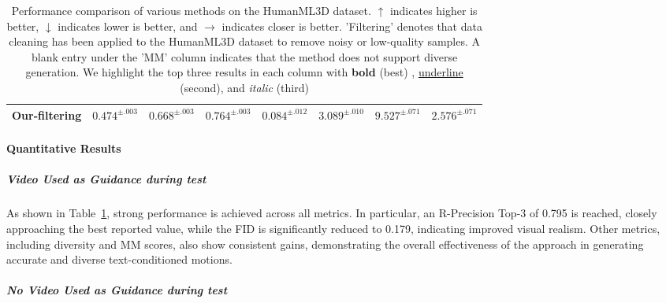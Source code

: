 \documentclass[a4paper,12pt]{article}
\begin{document}
\begin{table}[t]
\begin{tabular}{l|ccc|c|c|c|c}
Our-filtering   & $0.474^{\pm.003}$ & $0.668^{\pm.003}$ & $0.764^{\pm.003}$ & $0.084^{\pm.012}$ & $3.089^{\pm.010}$ & $9.527^{\pm.071}$ & $2.576^{\pm.071}$ \\
\bottomrule
\end{tabular}
\caption{
Performance comparison of various methods on the HumanML3D dataset. 
$\uparrow$ indicates higher is better, $\downarrow$ indicates lower is better, and $\rightarrow$ indicates closer is better.
'Filtering' denotes that data cleaning has been applied to the HumanML3D dataset to remove noisy or low-quality samples. A blank entry under the 'MM' column indicates that the method does not support diverse generation. We highlight the top three results in each column with 
\textbf{bold} (best) ,
\underline{underline} (second), and \textit{italic} (third)}
\label{tab:comparison}
\end{table}


\paragraph{Quantitative Results}

\subparagraph{Video Used as Guidance during test}
As shown in Table~\ref{tab:comparison}, strong performance is achieved across all metrics. In particular, an R-Precision Top-3 of 0.795 is reached, closely approaching the best reported value, while the FID is significantly reduced to 0.179, indicating improved visual realism. Other metrics, including diversity and MM scores, also show consistent gains, demonstrating the overall effectiveness of the approach in generating accurate and diverse text-conditioned motions.



\subparagraph{No Video Used as Guidance during test}
\end{document}
